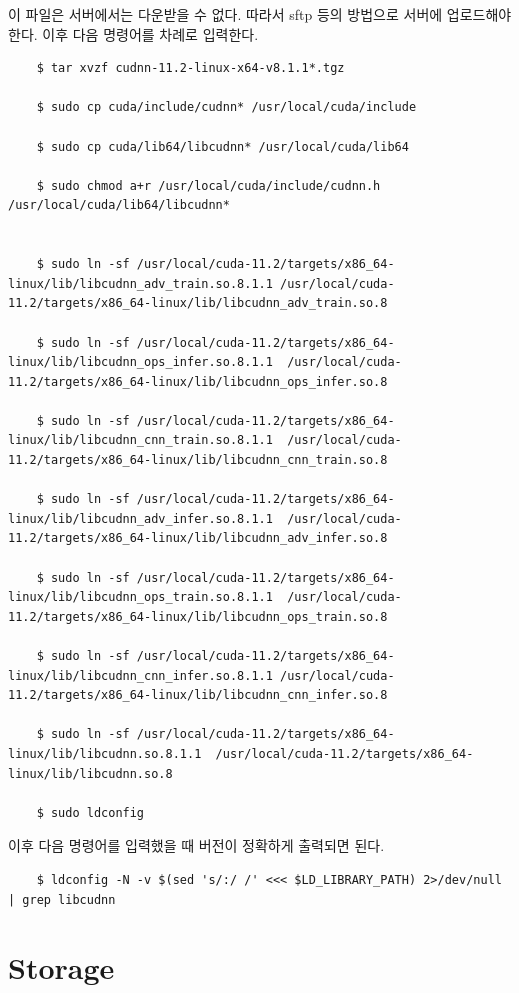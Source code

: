 이 파일은 서버에서는 다운받을 수 없다. 따라서 sftp 등의 방법으로 서버에 업로드해야 한다. 이후 다음 명령어를 차례로 입력한다.
\begin{lstlisting}
    $ tar xvzf cudnn-11.2-linux-x64-v8.1.1*.tgz

    $ sudo cp cuda/include/cudnn* /usr/local/cuda/include

    $ sudo cp cuda/lib64/libcudnn* /usr/local/cuda/lib64

    $ sudo chmod a+r /usr/local/cuda/include/cudnn.h /usr/local/cuda/lib64/libcudnn*


    $ sudo ln -sf /usr/local/cuda-11.2/targets/x86_64-linux/lib/libcudnn_adv_train.so.8.1.1 /usr/local/cuda-11.2/targets/x86_64-linux/lib/libcudnn_adv_train.so.8

    $ sudo ln -sf /usr/local/cuda-11.2/targets/x86_64-linux/lib/libcudnn_ops_infer.so.8.1.1  /usr/local/cuda-11.2/targets/x86_64-linux/lib/libcudnn_ops_infer.so.8

    $ sudo ln -sf /usr/local/cuda-11.2/targets/x86_64-linux/lib/libcudnn_cnn_train.so.8.1.1  /usr/local/cuda-11.2/targets/x86_64-linux/lib/libcudnn_cnn_train.so.8

    $ sudo ln -sf /usr/local/cuda-11.2/targets/x86_64-linux/lib/libcudnn_adv_infer.so.8.1.1  /usr/local/cuda-11.2/targets/x86_64-linux/lib/libcudnn_adv_infer.so.8

    $ sudo ln -sf /usr/local/cuda-11.2/targets/x86_64-linux/lib/libcudnn_ops_train.so.8.1.1  /usr/local/cuda-11.2/targets/x86_64-linux/lib/libcudnn_ops_train.so.8

    $ sudo ln -sf /usr/local/cuda-11.2/targets/x86_64-linux/lib/libcudnn_cnn_infer.so.8.1.1 /usr/local/cuda-11.2/targets/x86_64-linux/lib/libcudnn_cnn_infer.so.8

    $ sudo ln -sf /usr/local/cuda-11.2/targets/x86_64-linux/lib/libcudnn.so.8.1.1  /usr/local/cuda-11.2/targets/x86_64-linux/lib/libcudnn.so.8

    $ sudo ldconfig
\end{lstlisting}
이후 다음 명령어를 입력했을 때 버전이 정확하게 출력되면 된다.
\begin{lstlisting}
    $ ldconfig -N -v $(sed 's/:/ /' <<< $LD_LIBRARY_PATH) 2>/dev/null | grep libcudnn
\end{lstlisting}
\section{Storage}

